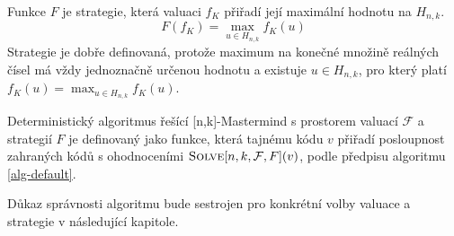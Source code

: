 
\begin{prikl}\label{prstrategie}
    Funkce $F$ je strategie, která valuaci $f_K$ přiřadí její maximální hodnotu na $H_{n,k}$.
    \[F(f_K) =  \max_{u\in H_{n,k}} f_K(u)\]
    Strategie je dobře definovaná, protože maximum na konečné množině reálných čísel má vždy jednoznačně určenou hodnotu a existuje $u\in H_{n,k}$, pro který platí $f_K(u) = \max_{u\in H_{n,k}} f_K(u)$.
\end{prikl}

\begin{definice}\label{defobecnyalg}
    Deterministický algoritmus řešící [n,k]-Mastermind s prostorem valuací $\mathcal{F}$ a strategií $F$ je definovaný jako funkce, která tajnému kódu $v$ přiřadí posloupnost zahraných kódů s ohodnoceními $\textsc{Solve}[n, k, \mathcal{F}, F](v)$, podle předpisu algoritmu \ref{alg-default}.
    
    
    
\end{definice}
\begin{pozn}
    Důkaz správnosti algoritmu bude sestrojen pro konkrétní volby valuace a strategie v následující kapitole. 
\end{pozn}








